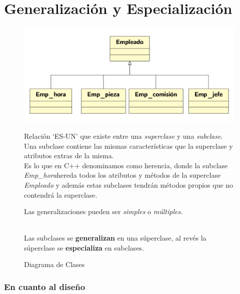 \chapter{Generalización y Especialización}

\begin{figure}[h]
  \begin{minipage}{0.5\textwidth}
    \includegraphics[width=\textwidth]{Imagenes/gen1.png}
    \caption{Diagrama de Clases}
  \end{minipage}
  \begin{minipage}{0.5\textwidth}
      \vspace{-1\baselineskip} %
Relación ‘ES-UN’ que existe entre una \textit{superclase} y una \textit{subclase}.\\

Una subclase contiene las mismas características que la superclase y atributos extras de la misma.\\

Es lo que en C++ denominamos como herencia, donde la subclase \textit{Emp\_hora}hereda todos los atributos y métodos de la superclase \textit{Empleado} y además estas subclases tendrán métodos propios que no contendrá la superclase.

Las generalizaciones pueden ser \textit{simples} o \textit{múltiples.}
  \end{minipage}
\\

Las subclases se \textbf{generalizan} en una súperclase, al revés la súperclase se \textbf{especializa} en subclases.
\end{figure}
\subsection{En cuanto al diseño}
